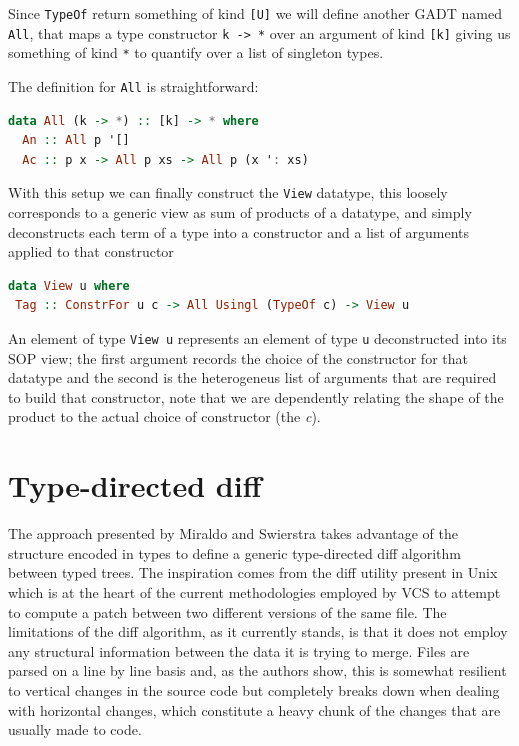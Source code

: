 \documentclass[11pt]{article}
\begin{document}
Since \texttt{TypeOf} return something of kind \texttt{{[}U{]}} we will
define another GADT named \texttt{All}, that maps a type constructor
\texttt{k\ -\textgreater{}\ *} over an argument of kind \texttt{{[}k{]}}
giving us something of kind \texttt{*} to quantify over a list of singleton types.

The definition for \texttt{All} is straightforward:

\begin{lstlisting}[language=haskell]
data All (k -> *) :: [k] -> * where
  An :: All p '[]
  Ac :: p x -> All p xs -> All p (x ': xs)
\end{lstlisting}

With this setup we can finally construct the \texttt{View} datatype,
this loosely corresponds to a generic view as sum of products of a
datatype, and simply deconstructs each term of a type into a constructor
and a list of arguments applied to that constructor

\begin{lstlisting}[language=haskell]
data View u where
 Tag :: ConstrFor u c -> All Usingl (TypeOf c) -> View u
\end{lstlisting}

An element of type \texttt{View u} represents an element of type \texttt{u} 
deconstructed into its SOP view; the first argument records the choice 
of the constructor for that datatype and the second is the heterogeneus list of 
arguments that are required to build that constructor, note that we are 
dependently relating the shape of the product to the actual choice of 
constructor (the \emph{c}).

\section{Type-directed diff}\label{type-directed-diff}

The approach presented by Miraldo and Swierstra \cite{type-directed-diff} takes advantage of the structure 
encoded in types to define a generic type-directed diff algorithm between
typed trees. The inspiration comes from the diff utility present in
Unix which is at the heart of the current methodologies employed by VCS
to attempt to compute a patch between two different versions of the same
file. The limitations of the diff algorithm, as it currently stands, is
that it does not employ any structural information between the data it
is trying to merge. Files are parsed on a line by line basis and, as
the authors show, this is somewhat resilient to vertical changes in the
source code but completely breaks down when dealing with horizontal
changes, which constitute a heavy chunk of the changes that are usually
made to code.
\end{document}
